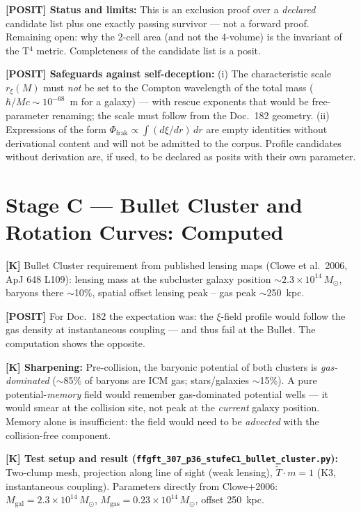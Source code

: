 \documentclass[11pt]{report}
\begin{document}
\medskip
\textbf{[POSIT] Status and limits:} This is an exclusion proof over a
\emph{declared} candidate list plus one exactly passing survivor — not
a forward proof. Remaining open: why the 2-cell area (and not the
4-volume) is the invariant of the T$^4$ metric. Completeness of the
candidate list is a posit.

\medskip
\textbf{[POSIT] Safeguards against self-deception:}
(i) The characteristic scale $r_\xi(M)$ must \emph{not} be set to the
Compton wavelength of the total mass ($\hbar/Mc \sim 10^{-68}$~m for a
galaxy) — with rescue exponents that would be free-parameter renaming;
the scale must follow from the Doc.~182 geometry. (ii) Expressions of
the form $\Phi_\text{frak} \propto \int (d\xi/dr)\,dr$ are empty
identities without derivational content and will not be admitted to the
corpus. Profile candidates without derivation are, if used, to be
declared as posits with their own parameter.

\section{Stage C — Bullet Cluster and Rotation Curves: Computed}

\textbf{[K]} Bullet Cluster requirement from published lensing maps
(Clowe et al.\ 2006, ApJ 648 L109): lensing mass at the subcluster
galaxy position $\sim 2.3\times 10^{14}\,M_\odot$, baryons there
$\sim$10\%, spatial offset lensing peak -- gas peak $\sim$250~kpc.

\medskip
\textbf{[POSIT]} For Doc.~182 the expectation was: the $\xi$-field
profile would follow the gas density at instantaneous coupling —
and thus fail at the Bullet. The computation shows the opposite.

\medskip
\textbf{[K] Sharpening:} Pre-collision, the baryonic potential of both
clusters is \emph{gas-dominated} ($\sim$85\% of baryons are ICM gas;
stars/galaxies $\sim$15\%). A pure potential-\emph{memory} field would
remember gas-dominated potential wells — it would smear at the collision
site, not peak at the \emph{current} galaxy position. Memory alone is
insufficient: the field would need to be \emph{advected} with the
collision-free component.

\medskip
\textbf{[K] Test setup and result
(\texttt{ffgft\_307\_p36\_stufeC1\_bullet\_cluster.py}):}
Two-clump mesh, projection along line of sight (weak lensing),
$\tilde T \cdot m = 1$ (K3, instantaneous coupling). Parameters
directly from Clowe+2006: $M_\text{gal} = 2.3\times10^{14}\,M_\odot$,
$M_\text{gas} = 0.23\times10^{14}\,M_\odot$, offset 250~kpc.
\end{document}
